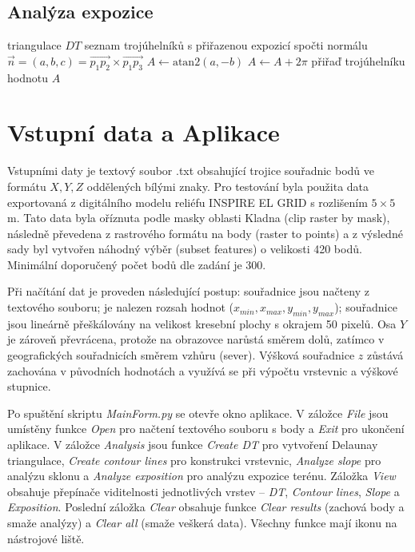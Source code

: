 \documentclass[11pt, a4paper]{article}
\begin{document}
\subsection{Analýza expozice}
\begin{algorithm}[H] \caption{Analyze Aspect}
\begin{algorithmic}[1]
\Require triangulace $DT$
\Ensure seznam trojúhelníků s přiřazenou expozicí
    \State spočti normálu $\vec{n} = (a, b, c) = \vec{p_1 p_2} \times \vec{p_1 p_3}$
    \State $A \gets \text{atan2}(a, -b)$ 
     $A \gets A + 2\pi$ \EndIf
    \State přiřaď trojúhelníku hodnotu $A$
\EndFor
\end{algorithmic}
\end{algorithm}

\newpage
\section{Vstupní data a Aplikace}
Vstupními daty je textový soubor .txt obsahující trojice souřadnic bodů ve formátu $X, Y, Z$ oddělených bílými znaky. Pro testování byla použita data exportovaná z digitálního modelu reliéfu INSPIRE EL GRID s rozlišením $5 \times 5$ m. Tato data byla oříznuta podle masky oblasti Kladna (clip raster by mask), následně převedena z rastrového formátu na body (raster to points) a z výsledné sady byl vytvořen náhodný výběr (subset features) o velikosti 420 bodů. Minimální doporučený počet bodů dle zadání je 300.

Při načítání dat je proveden následující postup: souřadnice jsou načteny z textového souboru; je nalezen rozsah hodnot ($x_{min}, x_{max}, y_{min}, y_{max}$); souřadnice jsou lineárně přeškálovány na velikost kresební plochy s okrajem 50 pixelů. Osa $Y$ je zároveň převrácena, protože na obrazovce narůstá směrem dolů, zatímco v geografických souřadnicích směrem vzhůru (sever). Výšková souřadnice $z$ zůstává zachována v původních hodnotách a využívá se při výpočtu vrstevnic a výškové stupnice.

Po spuštění skriptu \textit{MainForm.py} se otevře okno aplikace. V záložce \textit{File} jsou umístěny funkce \textit{Open} pro načtení textového souboru s body a \textit{Exit} pro ukončení aplikace. V záložce \textit{Analysis} jsou funkce \textit{Create DT} pro vytvoření Delaunay triangulace, \textit{Create contour lines} pro konstrukci vrstevnic, \textit{Analyze slope} pro analýzu sklonu a \textit{Analyze exposition} pro analýzu expozice terénu. Záložka \textit{View} obsahuje přepínače viditelnosti jednotlivých vrstev -- \textit{DT}, \textit{Contour lines}, \textit{Slope} a \textit{Exposition}. Poslední záložka \textit{Clear} obsahuje funkce \textit{Clear results} (zachová body a smaže analýzy) a \textit{Clear all} (smaže veškerá data). Všechny funkce mají ikonu na nástrojové liště.
\end{document}
